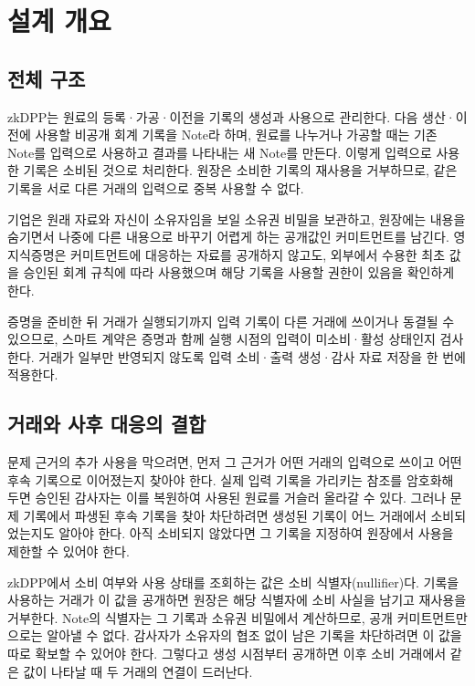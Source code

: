 \section{설계 개요}
\label{sec:system}
\label{sec:design-overview}

\subsection{전체 구조}

zkDPP는 원료의 등록·가공·이전을 기록의 생성과 사용으로 관리한다. 다음 생산·이전에 사용할 비공개 회계 기록을 Note라 하며, 원료를 나누거나 가공할 때는 기존 Note를 입력으로 사용하고 결과를 나타내는 새 Note를 만든다. 이렇게 입력으로 사용한 기록은 소비된 것으로 처리한다. 원장은 소비한 기록의 재사용을 거부하므로, 같은 기록을 서로 다른 거래의 입력으로 중복 사용할 수 없다.

기업은 원래 자료와 자신이 소유자임을 보일 소유권 비밀을 보관하고, 원장에는 내용을 숨기면서 나중에 다른 내용으로 바꾸기 어렵게 하는 공개값인 커미트먼트를 남긴다. 영지식증명은 커미트먼트에 대응하는 자료를 공개하지 않고도, 외부에서 수용한 최초 값을 승인된 회계 규칙에 따라 사용했으며 해당 기록을 사용할 권한이 있음을 확인하게 한다.

증명을 준비한 뒤 거래가 실행되기까지 입력 기록이 다른 거래에 쓰이거나 동결될 수 있으므로, 스마트 계약은 증명과 함께 실행 시점의 입력이 미소비·활성 상태인지 검사한다. 거래가 일부만 반영되지 않도록 입력 소비·출력 생성·감사 자료 저장을 한 번에 적용한다.

\subsection{거래와 사후 대응의 결합}

문제 근거의 추가 사용을 막으려면, 먼저 그 근거가 어떤 거래의 입력으로 쓰이고 어떤 후속 기록으로 이어졌는지 찾아야 한다. 실제 입력 기록을 가리키는 참조를 암호화해 두면 승인된 감사자는 이를 복원하여 사용된 원료를 거슬러 올라갈 수 있다. 그러나 문제 기록에서 파생된 후속 기록을 찾아 차단하려면 생성된 기록이 어느 거래에서 소비되었는지도 알아야 한다. 아직 소비되지 않았다면 그 기록을 지정하여 원장에서 사용을 제한할 수 있어야 한다.

zkDPP에서 소비 여부와 사용 상태를 조회하는 값은 소비 식별자(nullifier)다. 기록을 사용하는 거래가 이 값을 공개하면 원장은 해당 식별자에 소비 사실을 남기고 재사용을 거부한다. Note의 식별자는 그 기록과 소유권 비밀에서 계산하므로, 공개 커미트먼트만으로는 알아낼 수 없다. 감사자가 소유자의 협조 없이 남은 기록을 차단하려면 이 값을 따로 확보할 수 있어야 한다. 그렇다고 생성 시점부터 공개하면 이후 소비 거래에서 같은 값이 나타날 때 두 거래의 연결이 드러난다.

